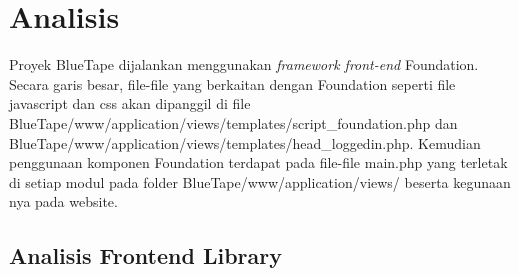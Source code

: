

\chapter{Analisis}
Proyek BlueTape dijalankan menggunakan \textit{framework front-end}  Foundation. Secara garis besar, file-file yang berkaitan dengan Foundation seperti file javascript dan css akan dipanggil di file BlueTape/www/application/views/templates/script{\_}foundation.php dan BlueTape/www/application/views/templates/head{\_}loggedin.php. Kemudian penggunaan komponen Foundation terdapat pada file-file main.php yang terletak di setiap modul pada folder BlueTape/www/application/views/ beserta kegunaan nya pada website.
\section{Analisis Frontend Library}
